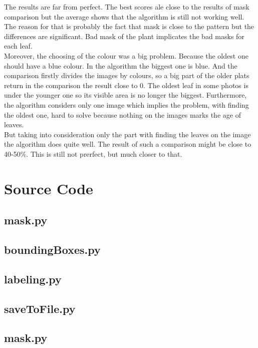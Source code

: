\documentclass[12pt]{article}
\begin{document}
The results are far from perfect. The best scores ale close to the results of mask comparison but the average shows that the algorithm  is still not working well.
The reason for that is probably the fact that mask is close to the pattern but the differences are significant. Bad mask of the plant implicates the bad masks for each leaf.\\
Moreover, the choosing of the colour was a big problem. Because the oldest one should have a blue colour. In the algorithm the biggest one is blue. And the comparison firstly divides the images by colours, so a big part of the older plats return in the comparison the result close to 0. The oldest leaf in some photos is under the younger one so its visible area is no longer the biggest. Furthermore, the algorithm considers only one image which implies the problem, with finding the oldest one, hard to solve because nothing on the images marks the age of leaves.
 \\
But taking into consideration only the part with finding the leaves on the image the algorithm does quite well. The result of such a comparison might be close to 40-50\%. This is still not prerfect, but much closer to that.

\section{Source Code}

\subsection{mask.py}


\subsection{boundingBoxes.py}


\subsection{labeling.py}


\subsection{saveToFile.py}


\subsection{mask.py}

\end{document}
